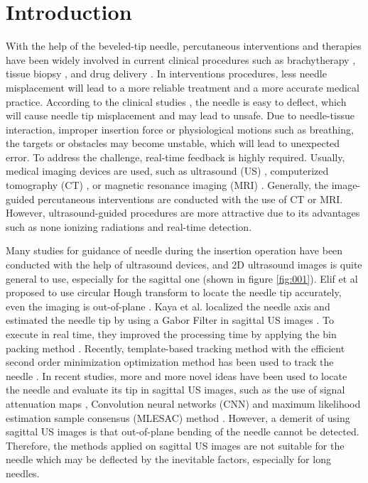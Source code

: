 \documentclass[journal,article,submit,moreauthors,pdftex]{Definitions/mdpi}
\begin{document}
\section{Introduction}
With the help of the beveled-tip needle, percutaneous interventions and therapies have been widely involved in current clinical procedures such as brachytherapy \cite{Orlando2019,Henken2017}, tissue biopsy  \cite{Nachabe2015,Mehrjardi2017a}, and drug delivery \cite{Jun2018,Park2018}.
In interventions procedures, less needle misplacement will lead to a more reliable treatment and a more accurate medical practice. According to the clinical studies \cite{Renfrew2018,Rossa2017b}, the needle is easy to deflect, which will cause needle tip misplacement and may lead to unsafe. Due to needle-tissue interaction, improper insertion force or physiological motions such as breathing, the targets or obstacles may become unstable, which will lead to unexpected error.
To address the challenge, real-time feedback is highly required.
Usually, medical imaging devices are used, such as ultrasound (US) \cite{VandeBerg2019a}, computerized tomography (CT) \cite{Li2018,Shellikeri2017a}, or magnetic resonance imaging (MRI) \cite{Henken2017,Raj2019}.
Generally, the image-guided percutaneous interventions are conducted with the use of CT or MRI.
However, ultrasound-guided procedures are more attractive due to its advantages such as none ionizing radiations and real-time detection.

Many studies for guidance of needle during the insertion operation have been conducted with the help of ultrasound devices, and 2D ultrasound images is quite general to use, especially for the sagittal one (shown in figure \ref{fig:001}).
Elif et al proposed to use circular Hough transform to locate the needle tip accurately, even the imaging is out-of-plane \cite{Ayvali2015}.
Kaya et al. localized the needle axis and estimated the needle tip by using a Gabor Filter in sagittal US images \cite{Kaya2014}.
To execute in real time, they improved the processing time by applying the bin packing method \cite{Kaya2015}.
Recently, template-based tracking method with the efficient second order minimization optimization method has been used to track the needle \cite{Kaya2019}.
In recent studies, more and more novel ideas have been used to locate the needle and evaluate its tip in sagittal US images, such as the use of signal attenuation maps \cite{Mwikirize2018}, Convolution neural networks (CNN) \cite{Mwikirize2018a} and maximum likelihood estimation sample consensus (MLESAC) method \cite{Xu2018a}.
However, a demerit of using sagittal US images is that out-of-plane bending of the needle cannot be detected.
Therefore, the methods applied on sagittal US images are not suitable for the needle which may be deflected by the inevitable factors, especially for long needles.
\end{document}
